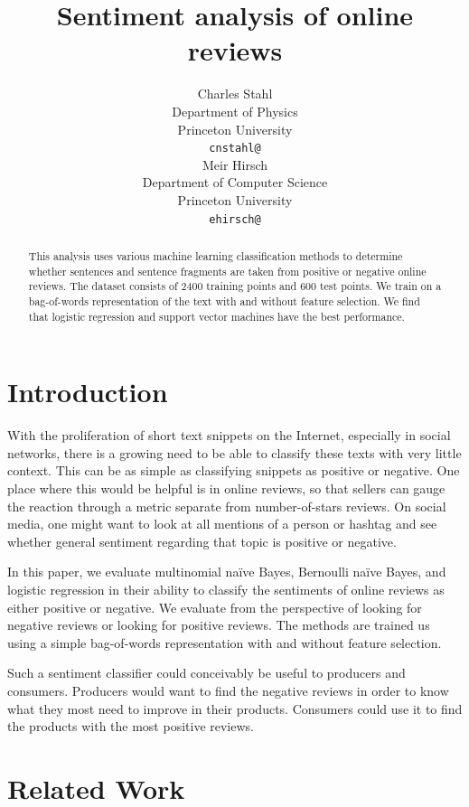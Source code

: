 \documentclass{article} %
\title{Sentiment analysis of online reviews}
\author{
	Charles Stahl\\
	Department of Physics\\
	Princeton University\\
	\texttt{cnstahl@} \\
	\And
	Meir Hirsch \\
	Department of Computer Science\\
	Princeton University \\
	\texttt{ehirsch@} \\
}
\begin{document}
	
	\maketitle
	
	\begin{abstract}
	This analysis uses various machine learning classification methods to determine whether sentences and sentence fragments are taken from positive or negative online reviews. The dataset consists of 2400 training points and 600 test points. We train on a bag-of-words representation of the text with and without feature selection. We find that logistic regression and support vector machines have the best performance. 
	\end{abstract}
	
	\section{Introduction}
	
	With the proliferation of short text snippets on the Internet, especially in social networks, there is a growing need to be able to classify these texts with very little context. This can be as simple as classifying snippets as positive or negative. One place where this would be helpful is in online reviews, so that sellers can gauge the reaction through a metric separate from number-of-stars reviews. On social media, one might want to look at all mentions of a person or hashtag and see whether general sentiment regarding that topic is positive or negative.
	
	In this paper, we evaluate multinomial na\"ive Bayes, Bernoulli na\"ive Bayes, and logistic regression in their ability to classify the sentiments of online reviews as either positive or negative. We evaluate from the perspective of looking for negative reviews or looking for positive reviews. The methods are trained us using a simple bag-of-words representation with and without feature selection. 
	
	Such a sentiment classifier could conceivably be useful to producers and consumers. Producers would want to find the negative reviews in order to know what they most need to improve in their products. Consumers could use it to find the products with the most positive reviews.
	
	\section{Related Work}
	
\end{document}

